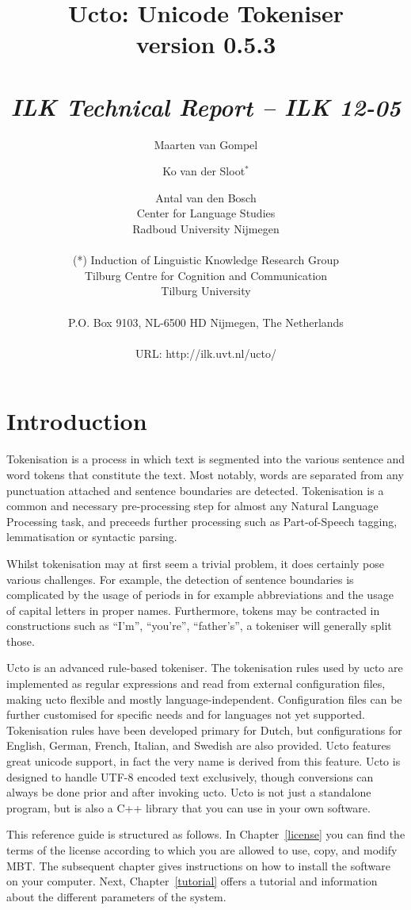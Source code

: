 \documentclass[a4paper,12pt]{report}
\author{Maarten van Gompel \and Ko van der Sloot$^*$ \and Antal van den Bosch \\
        Center for Language Studies \\
        Radboud University Nijmegen \\ \\  
        (*) Induction of Linguistic Knowledge Research Group\\
		Tilburg Centre for Cognition and Communication\\ 
        Tilburg University \\ \\       
    {\small P.O. Box 9103, NL-6500 HD Nijmegen, The Netherlands} \\ \\         
        URL: http://ilk.uvt.nl/ucto/}
\title{{\huge Ucto: Unicode Tokeniser} \\ \vspace*{0.5cm}
{\bf version 0.5.3} \\ \vspace*{0.5cm}{\huge Reference Guide}\\
\vspace*{1cm} {\it ILK Technical Report -- ILK 12-05}}
\begin{document}

\maketitle

\tableofcontents

\chapter*{Introduction}

Tokenisation is a process in which text is segmented into the various sentence and word tokens that constitute the text. Most notably, words are separated from any punctuation attached and sentence boundaries are detected. Tokenisation is a common and necessary pre-processing step for almost any Natural Language Processing task, and preceeds further processing such as Part-of-Speech tagging, lemmatisation or syntactic parsing. 

Whilst tokenisation may at first seem a trivial problem, it does certainly pose various challenges. For example, the detection of sentence boundaries is complicated by the usage of periods in for example abbreviations and the usage of capital letters in proper names. Furthermore, tokens may be contracted in constructions such as ``I'm'', ``you're'', ``father's'', a tokeniser will generally split those.

Ucto is an advanced rule-based tokeniser. The tokenisation rules used by ucto are implemented as regular expressions and read from external configuration files, making ucto flexible and mostly language-independent. Configuration files can be further customised for specific needs and for languages not yet supported. Tokenisation rules have been developed primary for Dutch, but configurations for English, German, French, Italian, and Swedish are also provided. Ucto features great unicode support, in fact the very name is derived from this feature. Ucto is designed to handle UTF-8 encoded text exclusively, though conversions can always be done prior and after invoking ucto. Ucto is not just a standalone program, but is also a C++ library that you can use in your own software. 

This reference guide is structured as follows. In Chapter~\ref{license} you can find the terms of the license according to which you are allowed to use, copy, and modify MBT. The subsequent chapter gives instructions on how to install the software on your computer.  Next, Chapter~\ref{tutorial} offers a tutorial and information about the different parameters of the system. 
\end{document}
